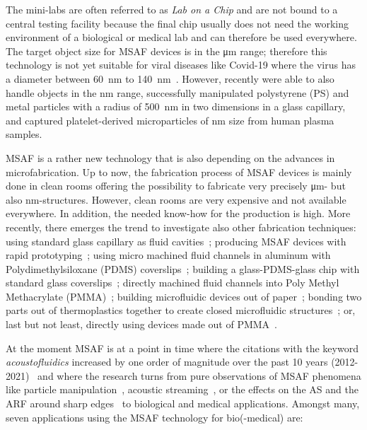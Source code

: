 The mini-labs are often referred to as \emph{Lab on a Chip} and are not bound 
to a central testing facility because the final chip usually does not need the 
working environment of a biological or medical lab and can therefore be used 
everywhere. The target object size for MSAF devices is in the \si{\um} range; 
therefore this technology is not yet suitable for viral diseases like Covid-19 
where the virus has a diameter between \SI{60}{\nm} to 
\SI{140}{\nm}~\cite{Bar-On2020}. However, recently  were able to 
also handle objects in the \si{\nano\meter} range,  
successfully manipulated polystyrene (PS) and metal particles with a radius of 
\SI{500}{\nm} in two dimensions in a glass capillary, and  
captured platelet-derived microparticles of \si{\nm} size from human plasma 
samples.

MSAF is a rather new technology that is also depending on the advances in 
microfabrication. Up to now, the fabrication process of MSAF devices is mainly 
done in clean rooms offering the possibility to fabricate very precisely 
\si{\um}- but also \si{\nm}-structures. However, clean rooms are very expensive 
and not available everywhere. In addition, the needed know-how for the 
production is high. More recently, there emerges the trend to investigate also 
other fabrication techniques: using standard glass capillary as fluid 
cavities~\cite{Wiklund2001,Hammarstrom2010,Hammarstrom2012,Mishra2014,Gralinski2014,Gerlt2022}; 
producing MSAF devices with rapid prototyping~\cite{Adams2012}; using micro 
machined fluid channels in aluminum with Polydimethylsiloxane (PDMS) 
coverslips~\cite{Gautam2018}; building a glass-PDMS-glass chip with standard 
glass coverslips~\cite{Xu2019}; directly machined fluid channels into Poly 
Methyl Methacrylate (PMMA)~\cite{Harris2012}; building microfluidic devices out 
of paper~\cite{Martinez2010}; bonding two parts out of thermoplastics together 
to create closed microfluidic structures~\cite{Mueller2013}; or, last but not 
least, directly using devices made out of PMMA~\cite{Gonzalez2015,Yang2017}.

At the moment MSAF is at a point in time where the citations with the keyword 
\emph{acoustofluidics} increased by one order of magnitude over the past 10 
years (2012-2021)~\cite{Novotny2021} and where the research turns from pure 
observations of MSAF phenomena like particle 
manipulation~\cite{Wiklund2012a,Laurell2007,Collins2016,Gedge2012,Ding2012b,Cetin2016b,Aubert2016,Novotny2021}, 
acoustic streaming~\cite{Hoyos2013,Castro2016,Lei2016}, or the effects on the 
AS and the ARF around sharp 
edges~\cite{Leibacher2015,Chen2021,Doinikov2020,Doinikov2020b} to biological 
and medical applications. Amongst many, seven applications using the MSAF 
technology for bio(-medical) are:

